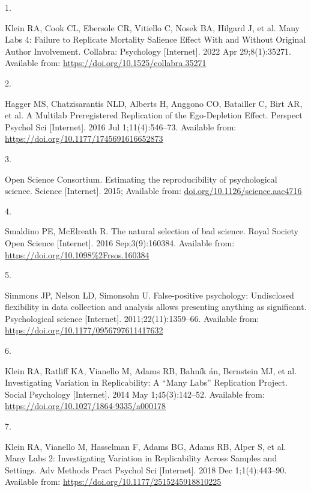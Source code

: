 \documentclass[
  english,
  a4paper,
]{article}
\newlength{\cslhangindent}
\newlength{\csllabelwidth}
\newlength{\cslentryspacingunit} %
\newenvironment{CSLReferences}[2] %
 {%
  \setlength{\parindent}{0pt}
  \ifodd #1
  \let\oldpar\par
  \def\par{\hangindent=\cslhangindent\oldpar}
  \fi
  \setlength{\parskip}{#2\cslentryspacingunit}
 }%
 {}
\newcommand{\CSLLeftMargin}[1]{\parbox[t]{\csllabelwidth}{#1}}
\newcommand{\CSLRightInline}[1]{\parbox[t]{\linewidth - \csllabelwidth}{#1}\break}
\begin{document}
\hypertarget{refs}{}
\begin{CSLReferences}{0}{0}
\leavevmode{}%
\CSLLeftMargin{1. }%
\CSLRightInline{Klein RA, Cook CL, Ebersole CR, Vitiello C, Nosek BA, Hilgard J, et al. Many {Labs} 4: {Failure} to {Replicate Mortality Salience Effect With} and {Without Original Author Involvement}. Collabra: Psychology {[}Internet{]}. 2022 Apr 29;8(1):35271. Available from: \url{https://doi.org/10.1525/collabra.35271}}

\leavevmode{}%
\CSLLeftMargin{2. }%
\CSLRightInline{Hagger MS, Chatzisarantis NLD, Alberts H, Anggono CO, Batailler C, Birt AR, et al. A {Multilab Preregistered Replication} of the {Ego-Depletion Effect}. Perspect Psychol Sci {[}Internet{]}. 2016 Jul 1;11(4):546--73. Available from: \url{https://doi.org/10.1177/1745691616652873}}

\leavevmode{}%
\CSLLeftMargin{3. }%
\CSLRightInline{Open Science Consortium. Estimating the reproducibility of psychological science. Science {[}Internet{]}. 2015; Available from: \href{https://doi.org/10.1126/science.aac4716}{doi.org/10.1126/science.aac4716}}

\leavevmode{}%
\CSLLeftMargin{4. }%
\CSLRightInline{Smaldino PE, McElreath R. The natural selection of bad science. Royal Society Open Science {[}Internet{]}. 2016 Sep;3(9):160384. Available from: \url{https://doi.org/10.1098\%2Frsos.160384}}

\leavevmode{}%
\CSLLeftMargin{5. }%
\CSLRightInline{Simmons JP, Nelson LD, Simonsohn U. False-positive psychology: Undisclosed flexibility in data collection and analysis allows presenting anything as significant. Psychological science {[}Internet{]}. 2011;22(11):1359--66. Available from: \url{https://doi.org/10.1177/0956797611417632}}

\leavevmode{}%
\CSLLeftMargin{6. }%
\CSLRightInline{Klein RA, Ratliff KA, Vianello M, Adams RB, Bahník án, Bernstein MJ, et al. Investigating {Variation} in {Replicability}: {A} {``{Many Labs}''} {Replication Project}. Social Psychology {[}Internet{]}. 2014 May 1;45(3):142--52. Available from: \url{https://doi.org/10.1027/1864-9335/a000178}}

\leavevmode{}%
\CSLLeftMargin{7. }%
\CSLRightInline{Klein RA, Vianello M, Hasselman F, Adams BG, Adams RB, Alper S, et al. Many {Labs} 2: {Investigating Variation} in {Replicability Across Samples} and {Settings}. Adv Methods Pract Psychol Sci {[}Internet{]}. 2018 Dec 1;1(4):443--90. Available from: \url{https://doi.org/10.1177/2515245918810225}}


\end{CSLReferences}
\end{document}
